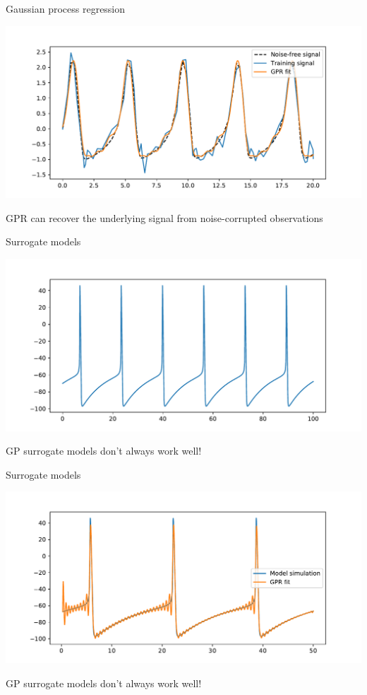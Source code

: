 \documentclass[presentation]{beamer}
\begin{document}
\begin{frame}[label={sec:org745afa2}]{Gaussian process regression}
\begin{center}
\includegraphics[width=.9\textwidth]{./GPR_demo.pdf}
\end{center}

GPR can recover the underlying signal from noise-corrupted observations
\end{frame}

\begin{frame}[label={sec:orgedf2408}]{Surrogate models}
\begin{center}
\includegraphics[width=.9\textwidth]{./HHraw.pdf}
\end{center}

GP surrogate models don't always work well!
\end{frame}

\begin{frame}[label={sec:orgd9932a3}]{Surrogate models}
\begin{center}
\includegraphics[width=.9\textwidth]{./HH_FKL_test.pdf}
\end{center}
GP surrogate models don't always work well!
\end{frame}
\end{document}
